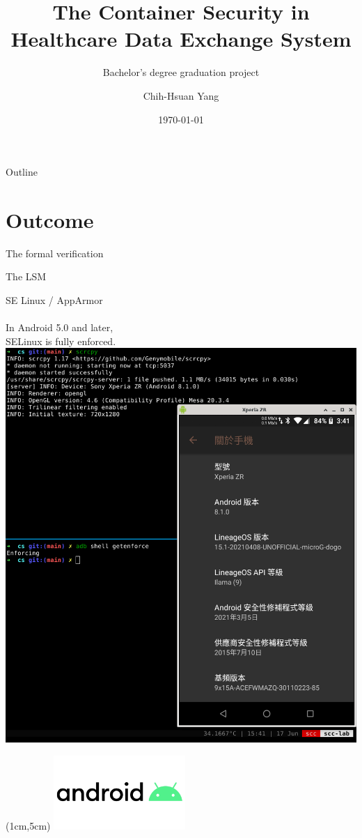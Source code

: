 \documentclass{beamer}
\title{The Container Security in Healthcare Data Exchange System}
\subtitle{Bachelor's degree graduation project}
\author{Chih-Hsuan Yang}
\institute{National Sun Yat-sen University\\
Advisor: Chun-I Fan
}
\date{\today}
\begin{document}
\begin{CJK*}{UTF8}{bsmi}

    \begin{frame}
        \titlepage
    \end{frame}

    \begin{frame}{Outline}
        \begin{multicols}{2}
            \tableofcontents
        \end{multicols}
    \end{frame}


    \section{Outcome}
    \begin{frame}
        \Huge \centering
        The formal verification
    \end{frame}
    {
    
    }

    \begin{frame}{The LSM}
        \begin{multicols}{2}
            SE Linux / AppArmor \\~\\
            In Android 5.0 and later, \\
            SELinux is fully enforced.
            \includegraphics[width=.5\textwidth]{selinux_android.png}
        \end{multicols}
        \begin{textblock*}{5cm}(1cm,5cm) %
            \includegraphics[width=5cm]{aosp.png}
        \end{textblock*}
    \end{frame}


\end{CJK*}
\end{document}
